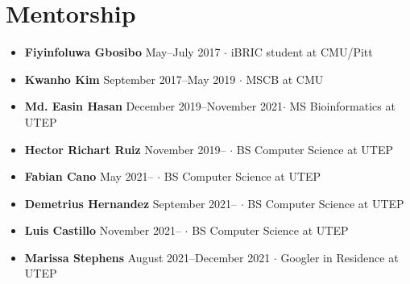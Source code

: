 \documentclass[10pt,letterpaper]{article}
\newcommand{\bigdot}{$\cdot$\xspace}
\begin{document}
\section*{Mentorship}
\begin{itemize}[leftmargin=*,labelindent=5pt,itemindent=-15pt]
\item \textbf{Fiyinfoluwa Gbosibo} May--July 2017 \bigdot iBRIC student at CMU/Pitt
\item \textbf{Kwanho Kim} September 2017--May 2019 \bigdot MSCB at CMU
\item \textbf{Md. Easin Hasan} December 2019--November 2021\bigdot MS Bioinformatics at UTEP
\item \textbf{Hector Richart Ruiz} November 2019-- \bigdot BS Computer Science at UTEP
\item \textbf{Fabian Cano} May 2021-- \bigdot BS Computer Science at UTEP
\item \textbf{Demetrius Hernandez} September 2021-- \bigdot BS Computer Science at UTEP
\item \textbf{Luis Castillo} November 2021-- \bigdot BS Computer Science at UTEP
\item \textbf{Marissa Stephens} August 2021--December 2021 \bigdot Googler in Residence at UTEP
\end{itemize}




\end{document}
